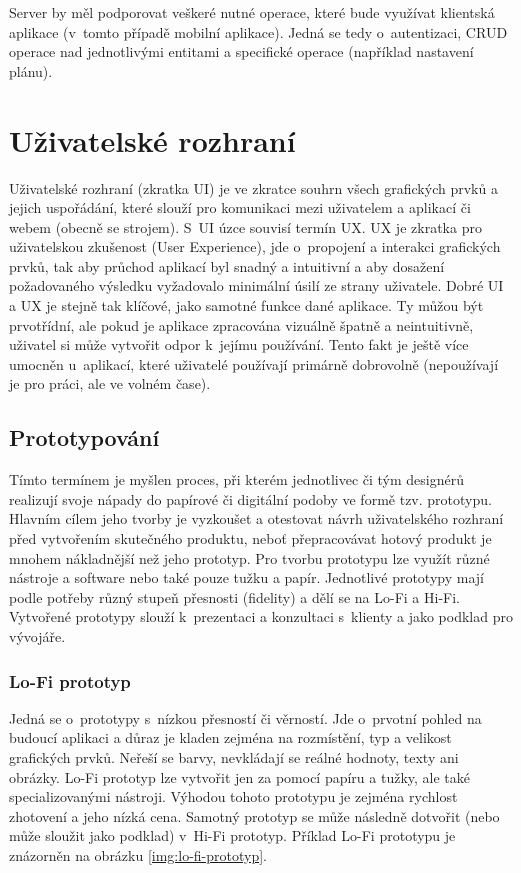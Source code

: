\documentclass[thesis=M,czech]{FITthesis}[2019/12/23]
\begin{document}
Server by měl podporovat veškeré nutné operace, které bude využívat klientská aplikace (v~tomto případě mobilní aplikace). Jedná se tedy o~autentizaci, CRUD operace nad jednotlivými entitami a specifické operace (například nastavení plánu).

\section{Uživatelské rozhraní}
Uživatelské rozhraní (zkratka UI) je ve zkratce souhrn všech grafických prvků a jejich uspořádání, které slouží pro komunikaci mezi uživatelem a aplikací či webem (obecně se strojem). S~UI úzce souvisí termín UX. UX je zkratka pro uživatelskou zkušenost (User Experience), jde o~propojení a interakci grafických prvků, tak aby průchod aplikací byl snadný a intuitivní a aby dosažení požadovaného výsledku vyžadovalo minimální úsilí ze strany uživatele. Dobré UI a UX je stejně tak klíčové, jako samotné funkce dané aplikace. Ty můžou být prvotřídní, ale pokud je aplikace zpracována vizuálně špatně a neintuitivně, uživatel si může vytvořit odpor k~jejímu používání. Tento fakt je ještě více umocněn u~aplikací, které uživatelé používají primárně dobrovolně (nepoužívají je pro práci, ale ve volném čase). \cite{what-is-ui}

\subsection{Prototypování}
Tímto termínem je myšlen proces, při kterém jednotlivec či tým designérů realizují svoje nápady do papírové či digitální podoby ve formě tzv. prototypu. Hlavním cílem jeho tvorby je vyzkoušet a otestovat návrh uživatelského rozhraní před vytvořením skutečného produktu, neboť přepracovávat hotový produkt je mnohem nákladnější než jeho prototyp. Pro tvorbu prototypu lze využít různé nástroje a software nebo také pouze tužku a papír. Jednotlivé prototypy mají podle potřeby různý stupeň přesnosti (fidelity) a dělí se na Lo-Fi a Hi-Fi. Vytvořené prototypy slouží k~prezentaci a konzultaci s~klienty a jako podklad pro vývojáře. \cite{prototyping-101}

\subsubsection{Lo-Fi prototyp}
Jedná se o~prototypy s~nízkou přesností či věrností. Jde o~prvotní pohled na budoucí aplikaci a důraz je kladen zejména na rozmístění, typ a velikost grafických prvků. Neřeší se barvy, nevkládají se reálné hodnoty, texty ani obrázky. Lo-Fi prototyp lze vytvořit jen za pomocí papíru a tužky, ale také specializovanými nástroji. Výhodou tohoto prototypu je zejména rychlost zhotovení a jeho nízká cena. Samotný prototyp se může následně dotvořit (nebo může sloužit jako podklad) v~Hi-Fi prototyp. Příklad Lo-Fi prototypu je znázorněn na obrázku \ref{img:lo-fi-prototyp}. \cite{prototypes-difference}
\end{document}
